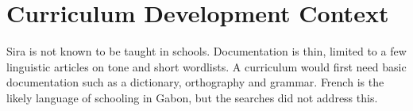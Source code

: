\documentclass[12pt]{article}
\begin{document}
\section{Curriculum Development Context}
Sira is not known to be taught in schools. Documentation is thin, limited to a few linguistic articles on tone and short wordlists. A curriculum would first need basic documentation such as a dictionary, orthography and grammar. French is the likely language of schooling in Gabon, but the searches did not address this.
\end{document}
